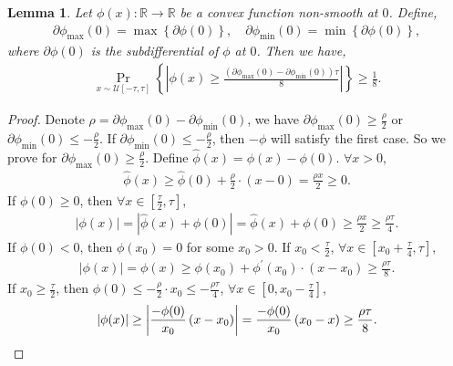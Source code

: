 \documentclass[10pt]{article}
\newtheorem{lem}{Lemma}
\def\sR{{\mathbb{R}}}
\def\gU{{\mathcal{U}}}
\DeclareMathOperator*{\probability}{Pr}
\begin{document}
\begin{lem}
\label{lem:non_smooth_convex}
	Let $\phi(x) : \sR \to \sR$ be a convex function non-smooth at $0$. Define,
\begin{equation*}
\begin{split}
	\partial\phi_{\max}{(0)} = \max\left\{ \partial\phi(0) \right\}, \quad \partial\phi_{\min}{(0)} = \min\left\{ \partial\phi(0) \right\},
\end{split}
\end{equation*}	
where $\partial\phi(0)$ is the subdifferential of $\phi$ at $0$. Then we have,
\begin{equation*}
\begin{split}
	\probability\limits_{x \sim \gU[-\tau, \tau]}\left\{ \left| \phi(x) \ge \frac{ \left( \partial\phi_{\max}{(0)} - \partial\phi_{\min}{(0)} \right) \tau}{8} \right|\right\} \ge \frac{1}{8}.
\end{split}
\end{equation*}	
\end{lem}
\begin{proof}
	Denote $\rho = \partial\phi_{\max}{(0)} - \partial\phi_{\min}{(0)}$, we have $\partial\phi_{\max}{(0)} \ge \frac{\rho}{2}$ or $\partial\phi_{\min}{(0)} \le - \frac{\rho}{2}$. If $\partial\phi_{\min}{(0)} \le - \frac{\rho}{2}$, then $-\phi$ will satisfy the first case. So we prove for $\partial\phi_{\max}{(0)} \ge \frac{\rho}{2}$. Define $\hat{\phi}(x) = \phi(x) - \phi(0)$. $\forall x > 0$,
\begin{equation*}
\begin{split}
	\hat{\phi}(x) \ge \hat{\phi}(0) + \frac{\rho}{2} \cdot \left( x - 0\right) = \frac{\rho x}{2} \ge 0.
\end{split}
\end{equation*}
If $\phi(0) \ge 0$, then $\forall x \in \left[\frac{\tau}{2}, \tau \right]$,
\begin{equation*}
\begin{split}
	\left| \phi(x) \right| = \left| \hat{\phi}(x) + \phi(0) \right| = \hat{\phi}(x) + \phi(0) \ge \frac{\rho x}{2} \ge \frac{\rho \tau}{4}.
\end{split}
\end{equation*}
If $\phi(0) < 0$, then $\phi(x_0) = 0$ for some $x_0 > 0$. If $x_0 < \frac{\tau}{2}$, $\forall x \in \left[x_0 + \frac{\tau}{4}, \tau \right]$,
\begin{equation*}
\begin{split}
	\left| \phi(x) \right| =  \phi(x) \ge \phi(x_0) + \phi^\prime(x_0) \cdot \left( x - x_0 \right) \ge \frac{\rho \tau}{8}.
\end{split}
\end{equation*}
If $x_0 \ge \frac{\tau}{2}$, then $\phi(0) \le - \frac{\rho}{2} \cdot x_0 \le - \frac{\rho\tau}{4}$, $\forall x \in \left[0, x_0 - \frac{\tau}{4} \right]$,
\begin{equation*}
	\left| \phi(x) \right| \ge \left| \frac{-\phi(0)}{x_0} \left( x - x_0 \right) \right| = \frac{-\phi(0)}{x_0} \left( x_0 - x \right) \ge \frac{\rho\tau}{8}. \qedhere
\end{equation*}
\end{proof}
\end{document}
